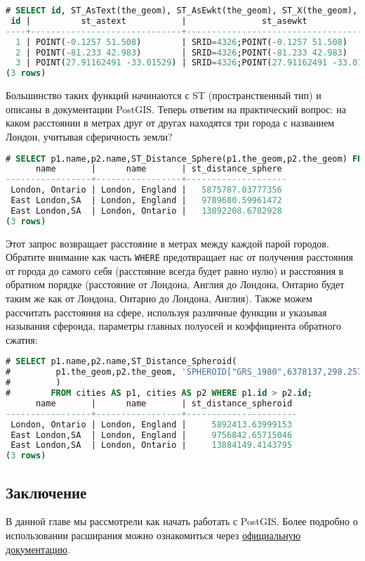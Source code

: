 \begin{lstlisting}[language=SQL,label=lst:postgisselectcities2,caption=SELECT cities]
# SELECT id, ST_AsText(the_geom), ST_AsEwkt(the_geom), ST_X(the_geom), ST_Y(the_geom) FROM cities;
 id |          st_astext           |               st_asewkt                |    st_x     |   st_y
----+------------------------------+----------------------------------------+-------------+-----------
  1 | POINT(-0.1257 51.508)        | SRID=4326;POINT(-0.1257 51.508)        |     -0.1257 |    51.508
  2 | POINT(-81.233 42.983)        | SRID=4326;POINT(-81.233 42.983)        |     -81.233 |    42.983
  3 | POINT(27.91162491 -33.01529) | SRID=4326;POINT(27.91162491 -33.01529) | 27.91162491 | -33.01529
(3 rows)
\end{lstlisting}

Большинство таких функций начинаются с ST (пространственный тип) и описаны в документации PostGIS. Теперь ответим на практический вопрос: на каком расстоянии в метрах друг от другах находятся три города с названием Лондон, учитывая сферичность земли?

\begin{lstlisting}[language=SQL,label=lst:postgisselectcities3,caption=Расстояние до Лондона]
# SELECT p1.name,p2.name,ST_Distance_Sphere(p1.the_geom,p2.the_geom) FROM cities AS p1, cities AS p2 WHERE p1.id > p2.id;
      name       |      name       | st_distance_sphere
-----------------+-----------------+--------------------
 London, Ontario | London, England |   5875787.03777356
 East London,SA  | London, England |   9789680.59961472
 East London,SA  | London, Ontario |   13892208.6782928
(3 rows)
\end{lstlisting}

Этот запрос возвращает расстояние в метрах между каждой парой городов. Обратите внимание как часть \lstinline!WHERE! предотвращает нас от получения расстояния от города до самого себя (расстояние всегда будет равно нулю) и расстояния в обратном порядке (расстояние от Лондона, Англия до Лондона, Онтарио будет таким же как от Лондона, Онтарио до Лондона, Англия). Также можем рассчитать расстояния на сфере, используя различные функции и указывая называния сфероида, параметры главных полуосей и коэффициента обратного сжатия:

\begin{lstlisting}[language=SQL,label=lst:postgisselectcities4,caption=Расстояние до Лондона]
# SELECT p1.name,p2.name,ST_Distance_Spheroid(
#         p1.the_geom,p2.the_geom, 'SPHEROID["GRS_1980",6378137,298.257222]'
#         )
#        FROM cities AS p1, cities AS p2 WHERE p1.id > p2.id;
      name       |      name       | st_distance_spheroid
-----------------+-----------------+----------------------
 London, Ontario | London, England |     5892413.63999153
 East London,SA  | London, England |     9756842.65715046
 East London,SA  | London, Ontario |     13884149.4143795
(3 rows)
\end{lstlisting}


\subsection{Заключение}

В данной главе мы рассмотрели как начать работать с PostGIS. Более подробно о использовании расширания можно ознакомиться через \href{http://postgis.net/documentation/}{официальную документацию}.
